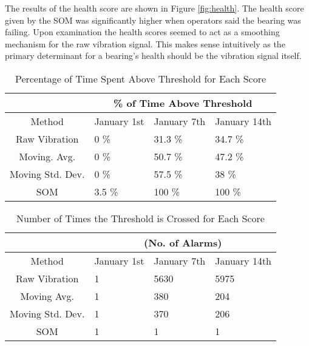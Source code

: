 The results of the health score are shown in Figure \ref{fig:health}.
The health score given by the SOM was significantly higher when operators said the bearing was failing.
Upon examination the health scores seemed to act as a smoothing mechanism for the raw vibration signal.
This makes sense intuitively as the primary determinant for a bearing's health should be the vibration signal itself.
\begin{table}[!h]
    \centering
    \caption{Percentage of Time Spent Above Threshold for Each Score}
    \begin{tabular}{|c|l|l|l|}
        \hline
                                          & \multicolumn{3}{c|}{\% of Time Above Threshold } \\ \hline
                                          Method                            & January 1st             & January 7th                & January 14th               \\ \hline \hline
                                          Raw Vibration              & 0 \%              & 31.3 \%           & 34.7 \%            \\ 
        Moving. Avg.             & 0 \%               & 50.7 \%             & 47.2 \%             \\
        Moving Std. Dev. & 0 \%               & 57.5 \%             & 38 \%               \\
        SOM                               & 3.5 \%               & 100 \%                & 100 \%                \\ \hline 
    \end{tabular}
    \label{tbl:percent}
\end{table}

\begin{table}[!h]
    \centering
    \caption{Number of Times the Threshold is Crossed for Each Score}    
    \begin{tabular}{|c|l|l|l|}
        \hline
                                          & \multicolumn{3}{c|}{ (No. of Alarms) } \\ \hline
                                          Method                            & January 1st             & January 7th                & January 14th               \\ \hline \hline
        Raw Vibration              & 1               & 5630            & 5975           \\ 
        Moving Avg.             & 1               & 380             & 204             \\ 
        Moving Std. Dev. & 1              & 370             & 206               \\ 
        SOM                               & 1               & 1               & 1                \\ \hline
    \end{tabular}
    \label{tbl:alarms}
\end{table}

